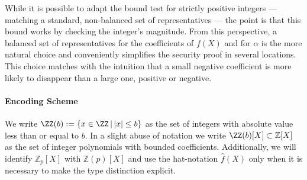 While it is possible to adapt the bound test for strictly positive integers --- matching a standard, non-balanced set of representatives --- the point is that this bound works by checking the integer's magnitude. From this perspective, a balanced set of representatives for the coefficients of $f(X)$ and for $\alpha$ is the more natural choice and conveniently simplifies the security proof in several locations. This choice matches with the intuition that a small negative coefficient is more likely to disappear than a large one, positive or negative.

\paragraph{Encoding Scheme}

We write $\ZZ(b):=\{x \in \ZZ \, | \, \vert x \vert  \leq b\}$ as the set of integers with absolute value less than or equal to $b$. In a slight abuse of notation we write $\ZZ(b)[X]\subset \mathbb{Z}[X]$ as the set of integer polynomials with bounded coefficients. Additionally, we will identify $\mathbb{Z}_p[X]$ with $\mathbb{Z}(p)[X]$ and use the hat-notation $\hat{f}(X)$ only when it is necessary to make the type distinction explicit.

